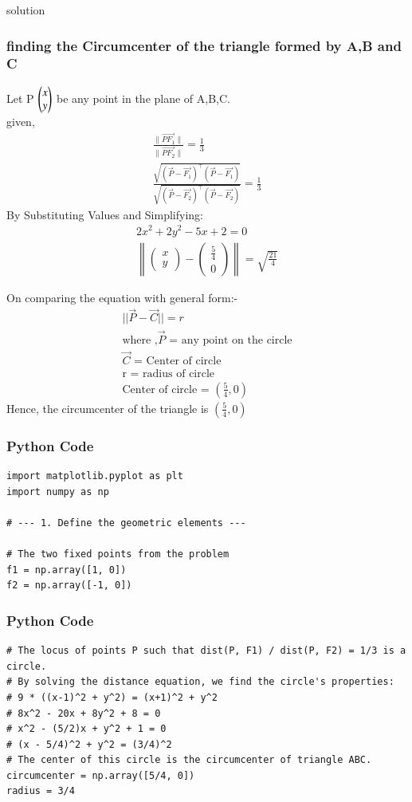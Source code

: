 \documentclass{beamer}
\begin{document}
\begin{frame}{solution}
    \frametitle{finding the Circumcenter of the triangle formed by A,B and C}
Let P $\begin{pmatrix}x\\y\end{pmatrix}$ be any point in the plane of A,B,C.\\
  given,
\begin{align}
\frac{\| \vec{PF_1} \|}{\| \vec{PF_2} \|} = \frac{1}{3}\\
\frac{\sqrt{(\vec{P}-\vec{F_1})^\top (\vec{P}-\vec{F_1})}}{\sqrt{(\vec{P}-\vec{F_2})^\top (\vec{P}-\vec{F_2})}} = \frac{1}{3}
\end{align}
By Substituting Values and Simplifying:
\begin{align}
2x^2 + 2y^2 - 5x + 2 = 0\\
\left\lVert
\begin{pmatrix} x \\ y \end{pmatrix}
-
\begin{pmatrix} \tfrac{5}{4} \\ 0 \end{pmatrix}
\right\lVert
= \sqrt{\tfrac{21}{4}}
\end{align}
\end{frame}
\begin{frame}
On comparing the equation with general form:-
\begin{align}
||\vec{P} - \vec{C}|| = r\\
\text{
where ,}
\text{
$\vec{P}$ = any point on the circle}\\
\text{$\vec{C}$ = Center of circle}\\
\text{
r = radius of circle}\\
\text{
Center of circle =  } \left(\frac{5}{4}, 0\right)
\end{align}
Hence, the circumcenter of the triangle is $\left(\frac{5}{4}, 0\right)$
\end{frame}


\begin{frame}[fragile]
    \frametitle{Python Code}
    \begin{lstlisting}
import matplotlib.pyplot as plt
import numpy as np

# --- 1. Define the geometric elements ---

# The two fixed points from the problem
f1 = np.array([1, 0])
f2 = np.array([-1, 0])
\end{lstlisting}
\end{frame}

\begin{frame}[fragile]
\frametitle{Python Code}
\begin{lstlisting}
# The locus of points P such that dist(P, F1) / dist(P, F2) = 1/3 is a circle.
# By solving the distance equation, we find the circle's properties:
# 9 * ((x-1)^2 + y^2) = (x+1)^2 + y^2
# 8x^2 - 20x + 8y^2 + 8 = 0
# x^2 - (5/2)x + y^2 + 1 = 0
# (x - 5/4)^2 + y^2 = (3/4)^2
# The center of this circle is the circumcenter of triangle ABC.
circumcenter = np.array([5/4, 0])
radius = 3/4
\end{lstlisting}
\end{frame}
\end{document}
